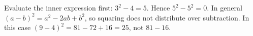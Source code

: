 Evaluate the inner expression first: $3^2-4=5$. Hence $5^2-5^2=\boxed0$. In general $(a-b)^2=a^2-2ab+b^2$, so squaring does not distribute over subtraction. In this case $(9-4)^2=81-72+16=25$, not $81-16$.

